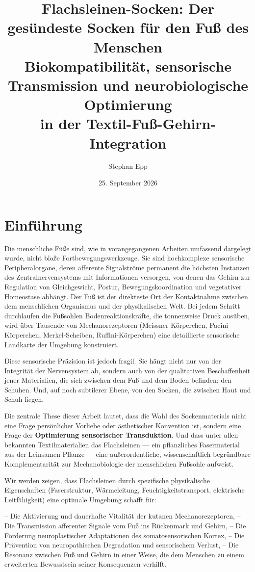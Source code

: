 \documentclass[a4paper,12pt]{article}
\title{\textbf{Flachsleinen-Socken: Der gesündeste Socken für den Fuß des Menschen}\\Biokompatibilität, sensorische Transmission und neurobiologische Optimierung\\in der Textil-Fuß-Gehirn-Integration}
\author{Stephan Epp}
\date{25. September 2026}
\theoremstyle{definition}
\begin{document}
\maketitle
\tableofcontents
\newpage

\section{Einführung}

Die menschliche Füße sind, wie in vorangegangenen Arbeiten umfassend dargelegt wurde, nicht bloße Fortbewegungswerkzeuge. Sie sind hochkomplexe sensorische Peripheralorgane, deren afferente Signalströme permanent die höchsten Instanzen des Zentralnervensystems mit Informationen versorgen, von denen das Gehirn zur Regulation von Gleichgewicht, Postur, Bewegungskoordination und vegetativer Homeostase abhängt. Der Fuß ist der direkteste Ort der Kontaktnahme zwischen dem menschlichen Organismus und der physikalischen Welt. Bei jedem Schritt durchlaufen die Fußsohlen Bodenreaktionskräfte, die tonnenweise Druck ausüben, wird über Tausende von Mechanorezeptoren (Meissner-Körperchen, Pacini-Körperchen, Merkel-Scheiben, Ruffini-Körperchen) eine detaillierte sensorische Landkarte der Umgebung konstruiert.

Diese sensorische Präzision ist jedoch fragil. Sie hängt nicht nur von der Integrität der Nervensystem ab, sondern auch von der qualitativen Beschaffenheit jener Materialien, die sich zwischen dem Fuß und dem Boden befinden: den Schuhen. Und, auf noch subtilerer Ebene, von den Socken, die zwischen Haut und Schuh liegen.

Die zentrale These dieser Arbeit lautet, dass die Wahl des Sockenmaterials nicht eine Frage persönlicher Vorliebe oder ästhetischer Konvention ist, sondern eine Frage der \textbf{Optimierung sensorischer Transduktion}. Und dass unter allen bekannten Textilmaterialien das Flachsleinen --- ein pflanzliches Fasermaterial aus der Leinsamen-Pflanze --- eine außerordentliche, wissenschaftlich begründbare Komplementarität zur Mechanobiologie der menschlichen Fußsohle aufweist.

Wir werden zeigen, dass Flachsleinen durch spezifische physikalische Eigenschaften (Faserstruktur, Wärmeleitung, Feuchtigkeitstransport, elektrische Leitfähigkeit) eine optimale Umgebung schafft für:

-- Die Aktivierung und dauerhafte Vitalität der kutanen Mechanorezeptoren,
-- Die Transmission afferenter Signale vom Fuß ins Rückenmark und Gehirn,
-- Die Förderung neuroplastischer Adaptationen des somatosensorischen Kortex,
-- Die Prävention von neuropathischen Degradation und sensorischem Verlust,
-- Die Resonanz zwischen Fuß und Gehirn in einer Weise, die dem Menschen zu einem erweiterten Bewusstsein seiner Konsequenzen verhilft.
\end{document}

